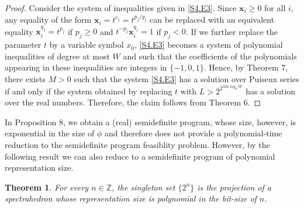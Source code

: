 \documentclass[10pt,a4paper]{article}
\newtheorem{theorem}{Theorem}
\theoremstyle{definition}
\begin{document}
\begin{proof}
Consider the system of inequalities given in \eqref{S4.E3}. Since $\bm{x}_{i}\geq 0$ for all $i$, any equality of the form $\bm{x}_{i}=t^{c_{j}}=t^{p_{j}/q_{j}}$ can be replaced with an equivalent equality $\bm{x}_{i}^{q_{j}}=t^{p_{j}}$ if $p_{j}\geq 0$ and $t^{-p_{j}}\bm{x}_{i}^{q_{j}}=1$ if $p_{j}<0$. If we further replace the parameter $t$ by a variable symbol $x_{0}$, \eqref{S4.E3} becomes a system of polynomial inequalities of degree at most $W$ and such that the coefficients of the polynomials appearing in these inequalities are integers in $\{-1,0,1\}$. Hence, by Theorem 7, there exists $M>0$ such that the system \eqref{S4.E3} has a solution over Puiseux series if and only if the system obtained by replacing $t$ with $L>2^{2^{Mn\log_{2}W}}$ has a solution over the real numbers. Therefore, the claim follows from Theorem 6. 

\end{proof}
In Proposition 8, we obtain a (real) semidefinite program, whose size, however, is exponential in the size of $\phi$ and therefore does not provide a polynomial-time reduction to the semidefinite program feasiblity problem. However, by the following result we can also reduce to a semidefinite program of polynomial representation size.

\setcounter{theorem}{8}
\begin{theorem}\label{Thmtheorem9}
For every $n\in{\mathbb{Z}}$, the singleton set $\{2^{n}\}$ is the projection of a spectrahedron whose representation size is polynomial in the bit-size of $n$.

\end{theorem}
\end{document}
